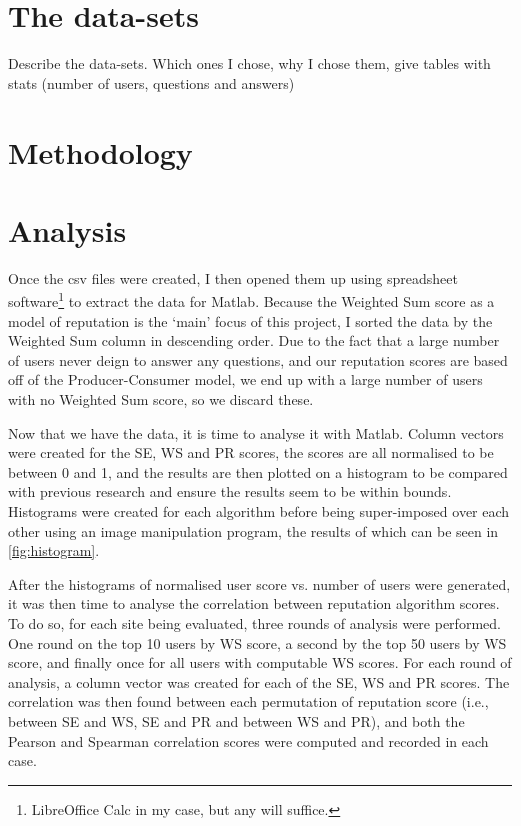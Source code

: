 \documentclass[]{final_report}
\begin{document}
\section{The data-sets}

Describe the data-sets. Which ones I chose, why I chose them, give tables with stats (number of users, questions and answers)

\section{Methodology}

\section{Analysis}

Once the csv files were created, I then opened them up using spreadsheet software\footnote{LibreOffice Calc in my case, but any will suffice.} to extract the data for Matlab. Because the Weighted Sum score as a model of reputation is the `main' focus of this project, I sorted the data by the Weighted Sum column in descending order. Due to the fact that a large number of users never deign to answer any questions, and our reputation scores are based off of the Producer-Consumer model, we end up with a large number of users with no Weighted Sum score, so we discard these.



Now that we have the data, it is time to analyse it with Matlab. Column vectors were created for the SE, WS and PR scores, the scores are all normalised to be between 0 and 1, and the results are then plotted on a histogram to be compared with previous research and ensure the results seem to be within bounds. Histograms were created for each algorithm before being super-imposed over each other using an image manipulation program, the results of which can be seen in \ref{fig:histogram}.


After the histograms of normalised user score vs. number of users were generated, it was then time to analyse the correlation between reputation algorithm scores. To do so, for each site being evaluated, three rounds of analysis were performed. One round on the top 10 users by WS score, a second by the top 50 users by WS score, and finally once for all users with computable WS scores. For each round of analysis, a column vector was created for each of the SE, WS and PR scores. The correlation was then found between each permutation of reputation score (i.e., between SE and WS, SE and PR and between WS and PR), and both the Pearson and Spearman correlation scores were computed and recorded in each case.
\end{document}

